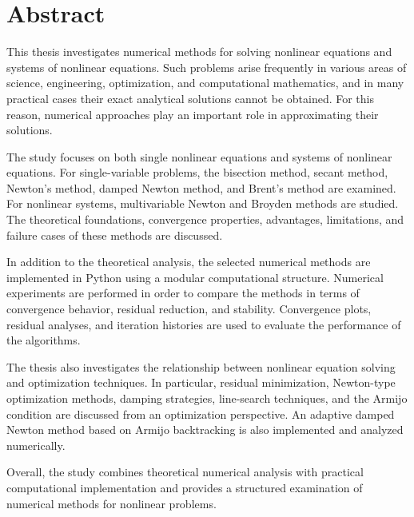 \chapter*{Abstract}

This thesis investigates numerical methods for solving nonlinear equations and systems of nonlinear equations. Such problems arise frequently in various areas of science, engineering, optimization, and computational mathematics, and in many practical cases their exact analytical solutions cannot be obtained. For this reason, numerical approaches play an important role in approximating their solutions.

The study focuses on both single nonlinear equations and systems of nonlinear equations. For single-variable problems, the bisection method, secant method, Newton's method, damped Newton method, and Brent's method are examined. For nonlinear systems, multivariable Newton and Broyden methods are studied. The theoretical foundations, convergence properties, advantages, limitations, and failure cases of these methods are discussed.

In addition to the theoretical analysis, the selected numerical methods are implemented in Python using a modular computational structure. Numerical experiments are performed in order to compare the methods in terms of convergence behavior, residual reduction, and stability. Convergence plots, residual analyses, and iteration histories are used to evaluate the performance of the algorithms.

The thesis also investigates the relationship between nonlinear equation solving and optimization techniques. In particular, residual minimization, Newton-type optimization methods, damping strategies, line-search techniques, and the Armijo condition are discussed from an optimization perspective. An adaptive damped Newton method based on Armijo backtracking is also implemented and analyzed numerically.

Overall, the study combines theoretical numerical analysis with practical computational implementation and provides a structured examination of numerical methods for nonlinear problems.